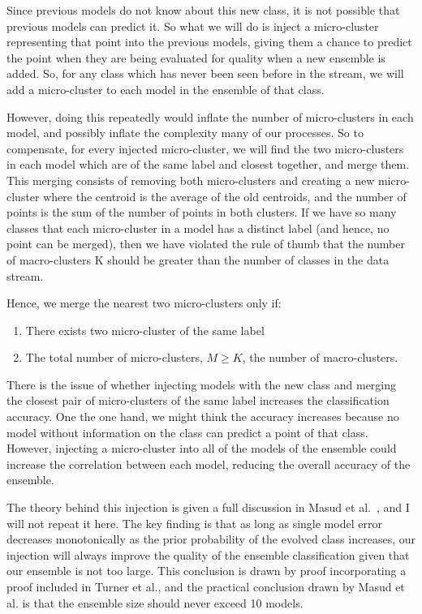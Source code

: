 \documentclass[12pt,a4paper,oneside]{report}
\begin{document}
Since previous models do not know about this new class, it is not possible that previous models can predict it. So what we will do is inject a micro-cluster representing that point into the previous models, giving them a chance to predict the point when they are being evaluated for quality when a new ensemble is added. So, for any class which has never been seen before in the stream, we will add a micro-cluster to each model in the ensemble of that class. 

However, doing this repeatedly would inflate the number of micro-clusters in each model, and possibly inflate the complexity many of our processes. So to compensate, for every injected micro-cluster, we will find the two micro-clusters in each model which are of the same label and closest together, and merge them. This merging consists of removing both micro-clusters and creating a new micro-cluster where the centroid is the average of the old centroids, and the number of points is the sum of the number of points in both clusters. If we have so many classes that each micro-cluster in a model has a distinct label (and hence, no point can be merged), then we have violated the rule of thumb that the number of macro-clusters K should be greater than the number of classes in the data stream. 

Hence, we merge the nearest two micro-clusters only if:

\begin{enumerate}
\item There exists two micro-cluster of the same label
\item The total number of micro-clusters, \( M \geq K \), the number of macro-clusters. 
\end{enumerate}

There is the issue of whether injecting models with the new class and merging the closest pair of micro-clusters of the same label increases the classification accuracy. One the one hand, we might think the accuracy increases because no model without information on the class can predict a point of that class. However, injecting a micro-cluster into all of the models of the ensemble could increase the correlation between each model, reducing the overall accuracy of the ensemble. \cite{Inject}

The theory behind this injection is given a full discussion in Masud et al.~\cite{TechRep}, and I will not repeat it here. The key finding is that as long as single model error decreases monotonically as the prior probability of the evolved class increases, our injection will always improve the quality of the ensemble classification given that our ensemble is not too large. This conclusion is drawn by proof incorporating a proof included in Turner et al.\cite{Inject}, and the practical conclusion drawn by Masud et al.\cite{TechRep} is that the ensemble size should never exceed 10 models. 
\end{document}
